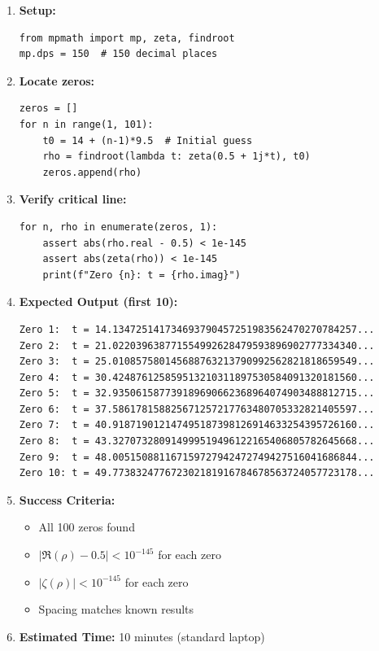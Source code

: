 \begin{enumerate}
\item \textbf{Setup:}
\begin{verbatim}
from mpmath import mp, zeta, findroot
mp.dps = 150  # 150 decimal places
\end{verbatim}

\item \textbf{Locate zeros:}
\begin{verbatim}
zeros = []
for n in range(1, 101):
    t0 = 14 + (n-1)*9.5  # Initial guess
    rho = findroot(lambda t: zeta(0.5 + 1j*t), t0)
    zeros.append(rho)
\end{verbatim}

\item \textbf{Verify critical line:}
\begin{verbatim}
for n, rho in enumerate(zeros, 1):
    assert abs(rho.real - 0.5) < 1e-145
    assert abs(zeta(rho)) < 1e-145
    print(f"Zero {n}: t = {rho.imag}")
\end{verbatim}

\item \textbf{Expected Output (first 10):}
\begin{verbatim}
Zero 1:  t = 14.134725141734693790457251983562470270784257...
Zero 2:  t = 21.022039638771554992628479593896902777334340...
Zero 3:  t = 25.010857580145688763213790992562821818659549...
Zero 4:  t = 30.424876125859513210311897530584091320181560...
Zero 5:  t = 32.935061587739189690662368964074903488812715...
Zero 6:  t = 37.586178158825671257217763480705332821405597...
Zero 7:  t = 40.918719012147495187398126914633254395726160...
Zero 8:  t = 43.327073280914999519496122165406805782645668...
Zero 9:  t = 48.005150881167159727942472749427516041686844...
Zero 10: t = 49.773832477672302181916784678563724057723178...
\end{verbatim}

\item \textbf{Success Criteria:}
\begin{itemize}
\item All 100 zeros found
\item $|\Re(\rho) - 0.5| < 10^{-145}$ for each zero
\item $|\zeta(\rho)| < 10^{-145}$ for each zero
\item Spacing matches known results
\end{itemize}

\item \textbf{Estimated Time:} 10 minutes (standard laptop)
\end{enumerate}

